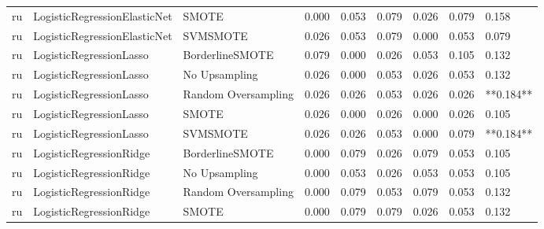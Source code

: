 \begin{tabular}{lllllllll}
      ru & LogisticRegressionElasticNet &               SMOTE & 0.000 &                     0.053 &                 0.079 &                  0.026 &                                   0.079 &     0.158 \\
      ru & LogisticRegressionElasticNet &            SVMSMOTE & 0.026 &                     0.053 &                 0.079 &                  0.000 &                                   0.053 &     0.079 \\
      ru &      LogisticRegressionLasso &     BorderlineSMOTE & 0.079 &                     0.000 &                 0.026 &                  0.053 &                                   0.105 &     0.132 \\
      ru &      LogisticRegressionLasso &       No Upsampling & 0.026 &                     0.000 &                 0.053 &                  0.026 &                                   0.053 &     0.132 \\
      ru &      LogisticRegressionLasso & Random Oversampling & 0.026 &                     0.026 &                 0.053 &                  0.026 &                                   0.026 & **0.184** \\
      ru &      LogisticRegressionLasso &               SMOTE & 0.026 &                     0.000 &                 0.026 &                  0.000 &                                   0.026 &     0.105 \\
      ru &      LogisticRegressionLasso &            SVMSMOTE & 0.026 &                     0.026 &                 0.053 &                  0.000 &                                   0.079 & **0.184** \\
      ru &      LogisticRegressionRidge &     BorderlineSMOTE & 0.000 &                     0.079 &                 0.026 &                  0.079 &                                   0.053 &     0.105 \\
      ru &      LogisticRegressionRidge &       No Upsampling & 0.000 &                     0.053 &                 0.026 &                  0.053 &                                   0.053 &     0.105 \\
      ru &      LogisticRegressionRidge & Random Oversampling & 0.000 &                     0.079 &                 0.053 &                  0.079 &                                   0.053 &     0.132 \\
      ru &      LogisticRegressionRidge &               SMOTE & 0.000 &                     0.079 &                 0.079 &                  0.026 &                                   0.053 &     0.132 \\

\end{tabular}
